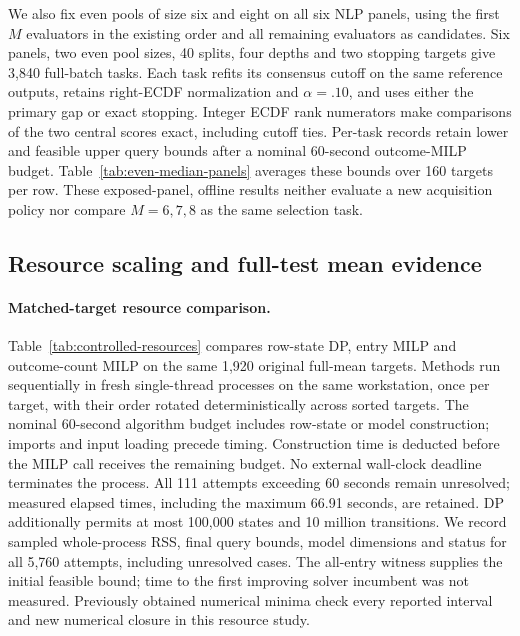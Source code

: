 We also fix even pools of size six and eight on all six NLP panels, using the first $M$ evaluators in the existing order and all remaining evaluators as candidates. Six panels, two even pool sizes, 40 splits, four depths and two stopping targets give 3,840 full-batch tasks. Each task refits its consensus cutoff on the same reference outputs, retains right-ECDF normalization and $\alpha=.10$, and uses either the primary gap or exact stopping. Integer ECDF rank numerators make comparisons of the two central scores exact, including cutoff ties. Per-task records retain lower and feasible upper query bounds after a nominal 60-second outcome-MILP budget. Table~\ref{tab:even-median-panels} averages these bounds over 160 targets per row. These exposed-panel, offline results neither evaluate a new acquisition policy nor compare $M=6,7,8$ as the same selection task.


\subsection{Resource scaling and full-test mean evidence}
\label{app:joint-scale}

\paragraph{Matched-target resource comparison.}
Table~\ref{tab:controlled-resources} compares row-state DP, entry MILP and outcome-count MILP on the same 1,920 original full-mean targets. Methods run sequentially in fresh single-thread processes on the same workstation, once per target, with their order rotated deterministically across sorted targets. The nominal 60-second algorithm budget includes row-state or model construction; imports and input loading precede timing. Construction time is deducted before the MILP call receives the remaining budget. No external wall-clock deadline terminates the process. All 111 attempts exceeding 60 seconds remain unresolved; measured elapsed times, including the maximum 66.91 seconds, are retained. DP additionally permits at most 100,000 states and 10 million transitions. We record sampled whole-process RSS, final query bounds, model dimensions and status for all 5,760 attempts, including unresolved cases. The all-entry witness supplies the initial feasible bound; time to the first improving solver incumbent was not measured. Previously obtained numerical minima check every reported interval and new numerical closure in this resource study.

